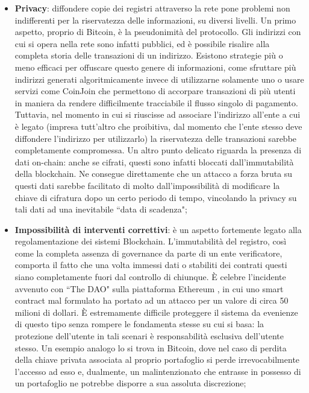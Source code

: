 \begin{itemize}
				\item \textbf{Privacy}: diffondere copie dei registri attraverso la rete pone problemi non indifferenti per la riservatezza delle informazioni, su diversi livelli. Un primo aspetto, proprio di Bitcoin, è la pseudonimità del protocollo. Gli indirizzi con cui si opera nella rete sono infatti pubblici, ed è possibile risalire alla completa storia delle transazioni di un indirizzo. Esistono strategie più o meno efficaci per offuscare questo genere di informazioni, come sfruttare più indirizzi generati algoritmicamente invece di utilizzarne solamente uno o usare servizi come CoinJoin che permettono di accorpare transazioni di più utenti in maniera da rendere difficilmente tracciabile il flusso singolo di pagamento. Tuttavia, nel momento in cui si riuscisse ad associare l'indirizzo all'ente a cui è legato (impresa tutt'altro che proibitiva, dal momento che l'ente stesso deve diffondere l'indirizzo per utilizzarlo) la riservatezza delle transazioni sarebbe completamente compromessa. Un altro punto delicato riguarda la presenza di dati on-chain: anche se cifrati, questi sono infatti bloccati dall'immutabilità della blockchain. Ne consegue direttamente che un attacco a forza bruta su questi dati sarebbe facilitato di molto dall'impossibilità di modificare la chiave di cifratura dopo un certo periodo di tempo, vincolando la privacy su tali dati ad una inevitabile ``data di scadenza"; 
				\item \textbf{Impossibilità di interventi correttivi}: è un aspetto fortemente legato alla regolamentazione dei sistemi Blockchain. L'immutabilità del registro, così come la completa assenza di governance da parte di un ente verificatore, comporta il fatto che una volta immessi dati o stabiliti dei contrati questi siano completamente fuori dal controllo di chiunque. È celebre l'incidente avvenuto con ``The DAO" sulla piattaforma Ethereum \cite{theDAO}, in cui uno smart contract mal formulato ha portato ad un attacco per un valore di circa 50 milioni di dollari. È estremamente difficile proteggere il sistema da evenienze di questo tipo senza rompere le fondamenta stesse su cui si basa: la protezione dell'utente in tali scenari è responsabilità esclusiva dell'utente stesso. Un esempio analogo lo si trova in Bitcoin, dove nel caso di perdita della chiave privata associata al proprio portafoglio si perde irrevocabilmente l'accesso ad esso e, dualmente, un malintenzionato che entrasse in possesso di un portafoglio ne potrebbe disporre a sua assoluta discrezione;

\end{itemize}
